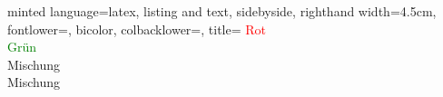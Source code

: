\documentclass[
    ngerman,
    accentcolor=3b,
    dark_mode,
    fontsize= 12pt,
    a4paper,
    aspectratio=169,
    colorback=true,
    fancy_row_colors,
    leqno,
    fleqn,
    boxarc=3pt,
    fleqn,
]{algoslides}
\begin{document}
    \begin{frame}[c, fragile]
        \slidehead{}
        \begin{codeBlock}[]{
            minted language=latex,
            listing and text,
            sidebyside,
            righthand width=4.5cm,
            fontlower=\setlength{\parskip}{\medskipamount}\setlength{\parindent}{0em},
            bicolor,
            colbacklower=,
            title=
            }
            \textcolor{red}{Rot}\\
            \textcolor{green}{Grün}\\
            \textcolor{blue!50!red}{Mischung}\\
            \textcolor{blue!50!red!50}{Mischung}
        \end{codeBlock}
    \end{frame}
\end{document}
